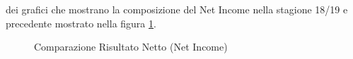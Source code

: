 \documentclass[
    corpo=11.5pt,
    oneside,
    evenboxes,
    tipotesi=triennale,
    stile=classica,
    oldstyle,
    autoretitolo,
    greek,
]{toptesi}
\begin{document}
\begin{interlinea}{1.5}
dei grafici che mostrano la composizione del Net Income nella stagione 18/19 e precedente mostrato nella figura \ref{comp_income}.
\begin{figure}
    \centering
     \quad
    \caption{Comparazione Risultato Netto (Net Income)}
    \label{comp_income}  
\end{figure}


\end{interlinea}
\end{document}
